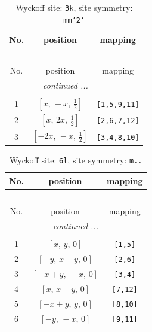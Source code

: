 \documentclass[fleqn,8pt]{jsarticle}
\begin{document}
\begin{longtable}{ccc}
\caption{Wyckoff site: {\tt 3k}, site symmetry: {\tt mm'2'}}
 \\
 \hline \hline
No. & position & mapping \\ \hline \endfirsthead

\multicolumn{2}{l}{\tablename\ \thetable{}} \\
 \hline \hline
No. & position & mapping \\ \hline \endhead

 \hline \hline
\multicolumn{2}{r}{\footnotesize\it continued ...} \\ \endfoot

 \hline \hline
\multicolumn{2}{r}{} \\ \endlastfoot

1 & $\left[ x,\, - x,\, \frac{1}{2} \right]$ & {\tt [1,5,9,11]} \\ \hline
2 & $\left[ x,\, 2 x,\, \frac{1}{2} \right]$ & {\tt [2,6,7,12]} \\ \hline
3 & $\left[ - 2 x,\, - x,\, \frac{1}{2} \right]$ & {\tt [3,4,8,10]} \\
\end{longtable}
\renewcommand{\arraystretch}{1.2}
\begin{longtable}{ccc}
\caption{Wyckoff site: {\tt 6l}, site symmetry: {\tt m..}}
 \\
 \hline \hline
No. & position & mapping \\ \hline \endfirsthead

\multicolumn{2}{l}{\tablename\ \thetable{}} \\
 \hline \hline
No. & position & mapping \\ \hline \endhead

 \hline \hline
\multicolumn{2}{r}{\footnotesize\it continued ...} \\ \endfoot

 \hline \hline
\multicolumn{2}{r}{} \\ \endlastfoot

1 & $\left[ x,\, y,\, 0 \right]$ & {\tt [1,5]} \\ \hline
2 & $\left[ - y,\, x - y,\, 0 \right]$ & {\tt [2,6]} \\ \hline
3 & $\left[ - x + y,\, - x,\, 0 \right]$ & {\tt [3,4]} \\ \hline
4 & $\left[ x,\, x - y,\, 0 \right]$ & {\tt [7,12]} \\ \hline
5 & $\left[ - x + y,\, y,\, 0 \right]$ & {\tt [8,10]} \\ \hline
6 & $\left[ - y,\, - x,\, 0 \right]$ & {\tt [9,11]} \\
\end{longtable}
\end{document}
